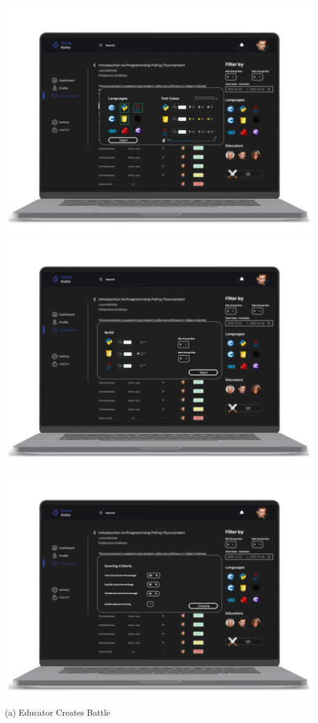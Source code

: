 \begin{center}
\includegraphics[scale=0.13]{Images/ui-ux/educator_creates_battle/educator_creates_battle_4.png}
\includegraphics[scale=0.13]{Images/ui-ux/educator_creates_battle/educator_creates_battle_5.png}
\includegraphics[scale=0.13]{Images/ui-ux/educator_creates_battle/educator_creates_battle_6.png}
        (a) Educator Creates Battle
\end{center}
